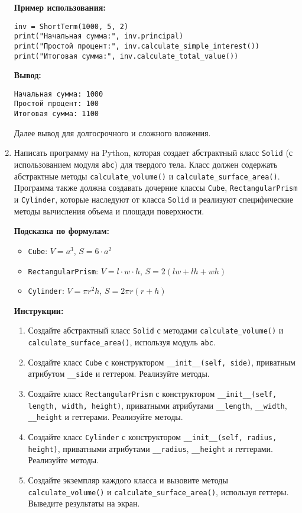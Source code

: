 \begin{enumerate}
\textbf{Пример использования:}
\begin{verbatim}
inv = ShortTerm(1000, 5, 2)
print("Начальная сумма:", inv.principal)
print("Простой процент:", inv.calculate_simple_interest())
print("Итоговая сумма:", inv.calculate_total_value())
\end{verbatim}

\textbf{Вывод:}
\begin{verbatim}
Начальная сумма: 1000
Простой процент: 100
Итоговая сумма: 1100
\end{verbatim}

Далее вывод для долгосрочного и сложного вложения.

\item
Написать программу на Python, которая создает абстрактный класс \texttt{Solid} (с использованием модуля \texttt{abc}) для твердого тела. 
Класс должен содержать абстрактные методы \texttt{calculate\_volume()} и \texttt{calculate\_surface\_area()}. 
Программа также должна создавать дочерние классы \texttt{Cube}, \texttt{RectangularPrism} и \texttt{Cylinder}, 
которые наследуют от класса \texttt{Solid} и реализуют специфические методы вычисления объема и площади поверхности.

\textbf{Подсказка по формулам:}
\begin{itemize}
    \item \texttt{Cube}: $V = a^3$, $S = 6 \cdot a^2$
    \item \texttt{RectangularPrism}: $V = l \cdot w \cdot h$, $S = 2(lw + lh + wh)$
    \item \texttt{Cylinder}: $V = \pi r^2 h$, $S = 2 \pi r (r + h)$
\end{itemize}

\textbf{Инструкции:}
\begin{enumerate}
    \item Создайте абстрактный класс \texttt{Solid} с методами \texttt{calculate\_volume()} и \texttt{calculate\_surface\_area()}, используя модуль \texttt{abc}.
    \item Создайте класс \texttt{Cube} с конструктором \texttt{\_\_init\_\_(self, side)}, приватным атрибутом \texttt{\_\_side} и геттером. Реализуйте методы.
    \item Создайте класс \texttt{RectangularPrism} с конструктором \texttt{\_\_init\_\_(self, length, width, height)}, приватными атрибутами \texttt{\_\_length}, \texttt{\_\_width}, \texttt{\_\_height} и геттерами. Реализуйте методы.
    \item Создайте класс \texttt{Cylinder} с конструктором \texttt{\_\_init\_\_(self, radius, height)}, приватными атрибутами \texttt{\_\_radius}, \texttt{\_\_height} и геттерами. Реализуйте методы.
    \item Создайте экземпляр каждого класса и вызовите методы \texttt{calculate\_volume()} и \texttt{calculate\_surface\_area()}, используя геттеры. Выведите результаты на экран.
\end{enumerate}


\end{enumerate}
